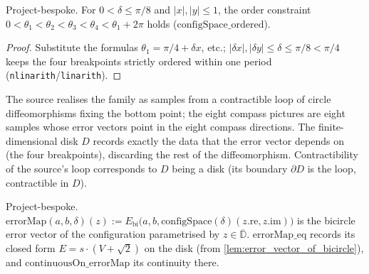 \begin{lemma}


  \label{lem:config_space_props}
  Project-bespoke. For $0<\delta\le\pi/8$ and $\lvert x\rvert,\lvert y\rvert\le 1$,
  the order constraint $0<\theta_1<\theta_2<\theta_3<\theta_4<\theta_1+2\pi$ holds
  ($\mathrm{configSpace\_ordered}$).
\end{lemma}
\begin{proof}


\leanok
  Substitute the formulas $\theta_1=\pi/4+\delta x$, etc.; $\lvert\delta
  x\rvert,\lvert\delta y\rvert\le\delta\le\pi/8<\pi/4$ keeps the four breakpoints
  strictly ordered within one period (\texttt{nlinarith}/\texttt{linarith}).
\end{proof}

\begin{remark}
  The source realises the family as samples from a contractible loop of
  circle diffeomorphisms fixing the bottom point; the eight compass pictures are
  eight samples whose error vectors point in the eight compass directions. The
  finite-dimensional disk $D$ records exactly the data that the error vector
  depends on (the four breakpoints), discarding the rest of the diffeomorphism.
  Contractibility of the source's loop corresponds to $D$ being a disk (its
  boundary $\partial D$ is the loop, contractible in $D$).
\end{remark}

\begin{definition}


  \label{def:error_map}
  Project-bespoke. $\mathrm{errorMap}(a,b,\delta)(z) := E_{\mathrm{bi}}\bigl(a,b,
  \mathrm{configSpace}(\delta)(z.\mathrm{re},z.\mathrm{im})\bigr)$ is the bicircle
  error vector of the configuration parametrised by $z\in\overline{\mathbb{D}}$.
  $\mathrm{errorMap\_eq}$ records its closed form $E = s\cdot(V+\sqrt2)$ on the
  disk (from \cref{lem:error_vector_of_bicircle}), and
  $\mathrm{continuousOn\_errorMap}$ its continuity there.
\end{definition}

